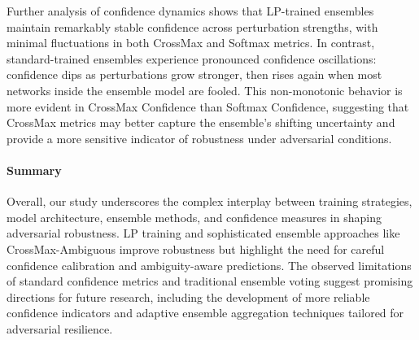 Further analysis of confidence dynamics shows that LP-trained ensembles maintain remarkably stable confidence across perturbation strengths, with minimal fluctuations in both CrossMax and Softmax metrics. In contrast, standard-trained ensembles experience pronounced confidence oscillations: confidence dips as perturbations grow stronger, then rises again when most networks inside the ensemble model are fooled. This non-monotonic behavior is more evident in CrossMax Confidence than Softmax Confidence, suggesting that CrossMax metrics may better capture the ensemble’s shifting uncertainty and provide a more sensitive indicator of robustness under adversarial conditions.

\paragraph{Summary}

Overall, our study underscores the complex interplay between training strategies, model architecture, ensemble methods, and confidence measures in shaping adversarial robustness. LP training and sophisticated ensemble approaches like CrossMax-Ambiguous improve robustness but highlight the need for careful confidence calibration and ambiguity-aware predictions. The observed limitations of standard confidence metrics and traditional ensemble voting suggest promising directions for future research, including the development of more reliable confidence indicators and adaptive ensemble aggregation techniques tailored for adversarial resilience.